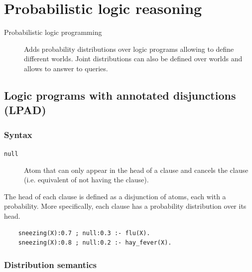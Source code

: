 \chapter{Probabilistic logic reasoning}

\begin{description}
    \item[Probabilistic logic programming] 
        Adds probability distributions over logic programs allowing to define different worlds.
        Joint distributions can also be defined over worlds and allows to answer to queries.
\end{description}



\section{Logic programs with annotated disjunctions (LPAD)}

\subsection{Syntax}

\begin{description}
    \item[\texttt{null}] 
        Atom that can only appear in the head of a clause and 
        cancels the clause (i.e. equivalent of not having the clause).
\end{description}

The head of each clause is defined as a disjunction of atoms, each with a probability.
More specifically, each clause has a probability distribution over its head.

\begin{example}
    \phantom{}
    \begin{lstlisting}
    sneezing(X):0.7 ; null:0.3 :- flu(X).
    sneezing(X):0.8 ; null:0.2 :- hay_fever(X).
    \end{lstlisting}
\end{example}


\subsection{Distribution semantics}

